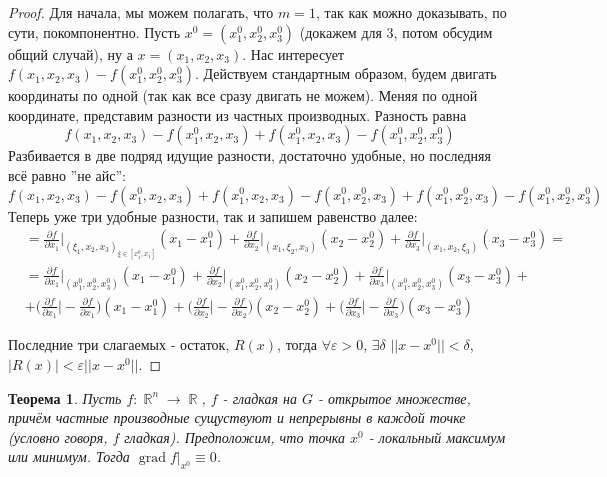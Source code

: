 \documentclass[a4paper,100pt]{article}
\theoremstyle{indented}
\newtheorem{theorem}{Теорема}
\theoremstyle{definition}
\theoremstyle{remark}
\DeclareMathOperator{\RR}{\mathbb{R}}
\DeclareMathOperator{\grad}{grad}
\begin{document}
\begin{proof}
    Для начала, мы можем полагать, что $m=1$, так как можно доказывать, по сути, покомпонентно. Пусть $x^0=(x_1^0, x_2^0, x_3^0)$ (докажем для 3, потом обсудим общий случай), ну а $x=(x_1, x_2, x_3)$. Нас интересует $f(x_1, x_2, x_3)-f(x_1^0, x_2^0, x_3^0)$. Действуем стандартным образом, будем двигать координаты по одной (так как все сразу двигать не можем). Меняя по одной координате, представим разности из частных производных. Разность равна 
    \[
        f(x_1, x_2, x_3)-f(x_1^0, x_2, x_3)+f(x_1^0, x_2, x_3)-f(x_1^0, x_2^0, x_3^0)
    \]
    Разбивается в две подряд идущие разности, достаточно удобные, но последняя всё равно ''не айс'':
    \[
        f(x_1, x_2, x_3)-f(x_1^0, x_2, x_3)+f(x_1^0, x_2, x_3)-f(x_1^0, x_2^0, x_3)+f(x_1^0, x_2^0, x_3)-f(x_1^0, x_2^0, x_3^0)
    \]
    Теперь уже три удобные разности, так и запишем равенство далее:
    \begin{equation*}
        \begin{aligned}
            &= \frac{\partial f}{\partial x_1}\bigg|_{(\xi_1, x_2, x_3)_{\xi\in [x_1^0, x_1]}}(x_1-x_1^0)+\frac{\partial f}{\partial x_2}\bigg|_{(x_1, \xi_2, x_3)}(x_2-x_2^0)+\frac{\partial f}{\partial x_3}\bigg|_{(x_1, x_2, \xi_3)}(x_3-x_3^0) = \\
            &= \frac{\partial f}{\partial x_1}\bigg|_{(x_1^0, x_2^0, x_3^0)}(x_1-x_1^0)+\frac{\partial f}{\partial x_2}\bigg|_{(x_1^0, x_2^0, x_3^0)}(x_2-x_2^0)+\frac{\partial f}{\partial x_3}\bigg|_{(x_1^0, x_2^0, x_3^0)}(x_3-x_3^0) + \\
            &+ \biggl(\frac{\partial f}{\partial x_1}\bigg| - \frac{\partial f}{\partial x_1}\biggr)(x_1-x_1^0)+\biggl(\frac{\partial f}{\partial x_2}\bigg| - \frac{\partial f}{\partial x_2}\biggr)(x_2-x_2^0)+\biggl(\frac{\partial f}{\partial x_3}\bigg| - \frac{\partial f}{\partial x_3}\biggr)(x_3-x_3^0)
        \end{aligned}
    \end{equation*}

    Последние три слагаемых - остаток, $R(x)$, тогда  $\forall \varepsilon >0$, $\exists \delta$ $||x-x^0||<\delta$, $|R(x)|<\varepsilon ||x-x^0||$. 


\end{proof}

\begin{theorem}
    Пусть $f:\RR^n\rightarrow \RR$, $f$ - гладкая на $G$ - открытое множестве, причём частные производные сущуствуют и непрерывны в каждой точке (условно говоря, $f$ гладкая). Предположим, что точка $x^0$ - локальный максимум или минимум. Тогда $\grad f|_{x^0}\equiv 0$.
\end{theorem}
\end{document}

